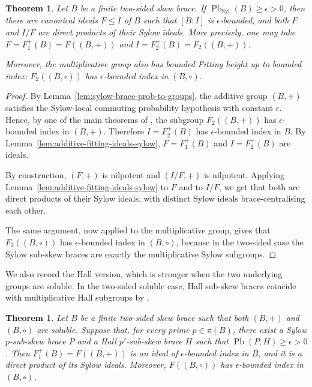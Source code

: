 \documentclass[11pt, oneside]{amsart}
\numberwithin{equation}{section}
\theoremstyle{plain}
\newtheorem{thm}[equation]{Theorem}
\theoremstyle{definition}
\newcommand{\Pb}{\operatorname{Pb} }
\newcommand{\Syl}{\operatorname{Syl} }
\begin{document}
\begin{thm}
\label{thm:sylow-fitting-two-sided-strong}
Let $B$ be a finite two-sided skew brace. If $\Pb_{\Syl}(B)\geqslant\epsilon>0$,
then there are canonical ideals $F\leqslant I$ of $B$ such that $[B:I]$ is
$\epsilon$-bounded, and both $F$ and $I/F$ are direct products of their
Sylow ideals. More precisely, one may take
$F=F^+_1(B)=F((B,+))$ and $I=F^+_2(B)=F_2((B,+))$.

Moreover, the multiplicative group also has bounded Fitting height up to
bounded index: $F_2((B,\circ))$ has $\epsilon$-bounded index in
$(B,\circ)$.
\end{thm}

\begin{proof}
By Lemma~\ref{lem:sylow-brace-prob-to-groups}, the additive group $(B,+)$
satisfies the Sylow-local commuting probability hypothesis with constant
$\epsilon$. Hence, by one of the main theorems of \cite{DLMS25}, the subgroup $F_2((B,+))$ has
$\epsilon$-bounded index in $(B,+)$. Therefore $I=F^+_2(B)$ has
$\epsilon$-bounded index in $B$. By Lemma~\ref{lem:additive-fitting-ideals-sylow},
$F=F^+_1(B)$ and $I=F^+_2(B)$ are ideals.

By construction, $(F,+)$ is nilpotent and $(I/F,+)$ is nilpotent. Applying
Lemma~\ref{lem:additive-fitting-ideals-sylow} to $F$ and to $I/F$, we get
that both are direct products of their Sylow ideals, with distinct Sylow
ideals brace-centralising each other.

The same argument, now applied to the multiplicative group, gives that
$F_2((B,\circ))$ has $\epsilon$-bounded index in $(B,\circ)$, because in
the two-sided case the Sylow sub-skew braces are exactly the multiplicative
Sylow subgroups.
\end{proof}



We also record the Hall version, which is stronger when the two underlying
groups are soluble. In the two-sided soluble case, Hall sub-skew braces
coincide with multiplicative Hall subgroups by \cite[Theorem 14]{CDMFT26}.

\begin{thm} %
Let $B$ be a finite two-sided skew brace such that both $(B,+)$ and
$(B,\circ)$ are soluble. Suppose that, for every prime $p\in\pi(B)$, there
exist a Sylow $p$-sub-skew brace $P$ and a Hall $p'$-sub-skew brace $H$
such that $\Pb(P,H)\geqslant\epsilon>0$. Then $F^+_1(B)=F((B,+))$ is an ideal
of $\epsilon$-bounded index in $B$, and it is a direct product of its
Sylow ideals. Moreover, $F((B,\circ))$ has $\epsilon$-bounded index in
$(B,\circ)$.
\end{thm}
\end{document}
